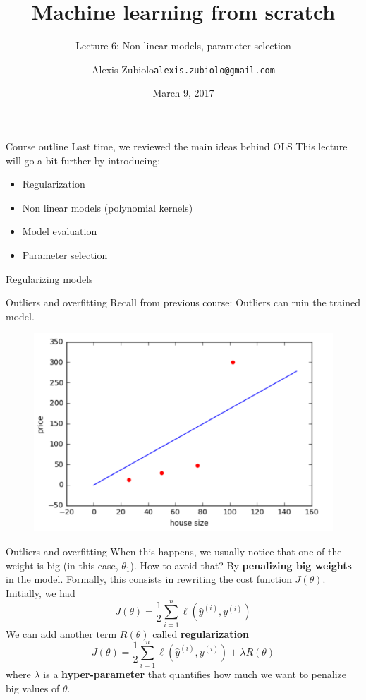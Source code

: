 \documentclass{beamer}
\title{Machine learning from scratch}
\subtitle{Lecture 6: Non-linear models, parameter selection}
\author{Alexis Zubiolo\newline\texttt{alexis.zubiolo@gmail.com}}
\institute{Data Science Team Lead @ Adcash}
\date{March 9, 2017}
\newcommand{\1}[1]{\mathbbm{1}\left[#1\right]}
\newcommand{\yi}{y^{(i)}}
\newcommand{\yhati}{\hat{y}^{(i)}}
\begin{document}
\begin{frame}
  \titlepage
\end{frame}

\begin{frame}{Course outline}
Last time, we reviewed the main ideas behind OLS
\vfill
\pause
This lecture will go a bit further by introducing:
\begin{itemize}
	\item Regularization
	\item Non linear models (polynomial kernels)
	\item Model evaluation
	\item Parameter selection
\end{itemize}
\end{frame}

\begin{frame}
	\center
	\huge{Regularizing models}
\end{frame}

\begin{frame}{Outliers and overfitting}
Recall from previous course: Outliers can ruin the trained model.
\pause
\vfill
\begin{figure}
\centering
\includegraphics[width=\linewidth]{images/line_regression_outlier.png}
\end{figure}
\end{frame}

\begin{frame}{Outliers and overfitting}
When this happens, we usually notice that one of the weight is big (in this case, $\theta_1$).
\pause
\vfill
How to avoid that? \pause By \textbf{penalizing big weights} in the model.
\pause
\vfill 
Formally, this consists in rewriting the cost function $J(\theta)$. Initially, we had 
\begin{equation*}
J(\theta) = \dfrac{1}{2} \sum_{i = 1}^{n} \ell \left( \yhati, \yi \right)
\end{equation*}
\pause
\vfill 
We can add another term $R(\theta)$ called \textbf{regularization}
\begin{equation*}
J(\theta) = \dfrac{1}{2} \sum_{i = 1}^{n} \ell \left( \yhati, \yi \right) + \lambda R(\theta)
\end{equation*}
\pause
\vfill
where $\lambda$ is a \textbf{hyper-parameter} that quantifies how much we want to penalize big values of $\theta$.
\end{frame}
\end{document}
